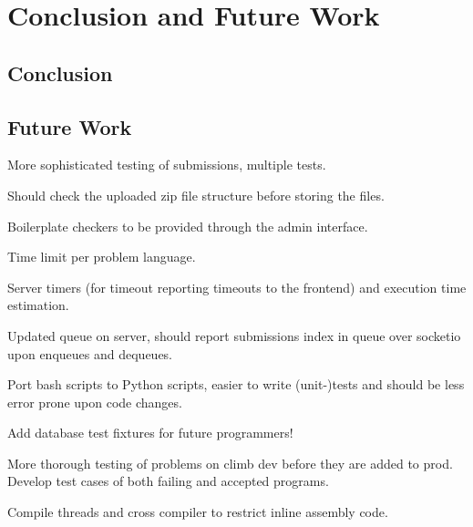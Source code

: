 \chapter{Conclusion and Future Work}

\section{Conclusion}

\section{Future Work}
\label{sec:future-work}

More sophisticated testing of submissions, multiple tests.

Should check the uploaded zip file structure before storing the files.

Boilerplate checkers to be provided through the admin interface.

Time limit per problem language.

Server timers (for timeout reporting timeouts to the frontend) and execution time estimation.

Updated queue on server, should report submissions index in queue over socketio upon enqueues and dequeues.

Port bash scripts to Python scripts, easier to write (unit-)tests and should be less error prone upon code changes.

Add database test fixtures for future programmers!

More thorough testing of problems on climb dev before they are added to prod. Develop test cases of both failing and accepted programs.

Compile threads and cross compiler to restrict inline assembly code.
